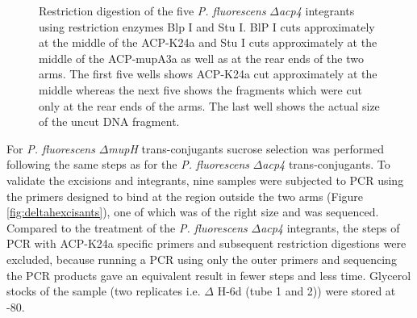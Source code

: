 		\setlength\fboxsep{5pt}
		\setlength\fboxrule{1.5pt}
		\begin{figure}[htbp]
		\centering
		\caption[Restriction digestion of the five \textit{P. fluorescens} $ \Delta $\textit{acp4} integrants.]{Restriction digestion of the five \textit{P. fluorescens} $ \Delta $\textit{acp4} integrants using restriction enzymes Blp I and Stu I. BlP I cuts approximately at the middle of the ACP-K24a and Stu I cuts approximately at the middle of the ACP-mupA3a as well as at the rear ends of the two arms. The first five wells shows ACP-K24a cut approximately at the middle whereas the next five shows the fragments which were cut only at the rear ends of the arms. The last well shows the actual size of the uncut DNA fragment.}
		\label{fig:delta4restriction}
		\end{figure}			
	
	For \textit{P. fluorescens} $ \Delta $\textit{mupH} trans-conjugants sucrose selection was performed following the same steps as for the \textit{P. fluorescens} $ \Delta $\textit{acp4} trans-conjugants. To validate the excisions and integrants, nine samples were subjected to PCR using the primers designed to bind at the region outside the two arms (Figure \ref{fig:deltahexcisants}), one of which was of the right size and was sequenced. Compared to the treatment of the \textit{P. fluorescens} $ \Delta $\textit{acp4} integrants, the steps of PCR with ACP-K24a specific primers and subsequent restriction digestions were excluded, because running a PCR using only the outer primers and sequencing the PCR products gave an equivalent result in fewer steps and less time. Glycerol stocks of the sample (two replicates i.e. $ \Delta $ H-6d (tube 1 and 2)) were stored at -80\textcelsius.
	

